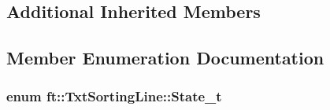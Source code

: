 \subsection*{Additional Inherited Members}


\subsection{Member Enumeration Documentation}
\subsubsection[{\texorpdfstring{State\+\_\+t}{State_t}}]{\setlength{\rightskip}{0pt plus 5cm}enum {\bf ft\+::\+Txt\+Sorting\+Line\+::\+State\+\_\+t}}\hypertarget{classft_1_1_txt_sorting_line_a02aa5385ab3fe32f2c3ca14a56e5ba57}{}\label{classft_1_1_txt_sorting_line_a02aa5385ab3fe32f2c3ca14a56e5ba57}
